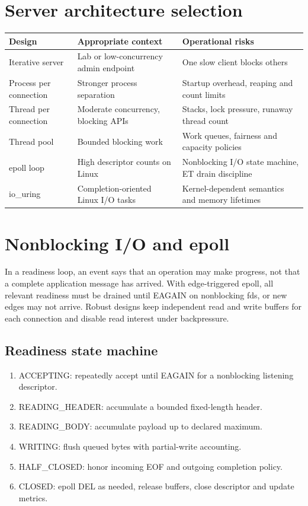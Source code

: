 \documentclass[11pt,letterpaper,oneside]{report}
\begin{document}
\chapter{Server architecture selection}
\begin{longtable}{p{.19\linewidth}>{\raggedright\arraybackslash}p{.28\linewidth}>{\raggedright\arraybackslash}p{.39\linewidth}}\toprule
Design & Appropriate context & Operational risks\\\midrule\endhead
Iterative server & Lab or low-concurrency admin endpoint & One slow client blocks others\\
Process per connection & Stronger process separation & Startup overhead, reaping and count limits\\
Thread per connection & Moderate concurrency, blocking APIs & Stacks, lock pressure, runaway thread count\\
Thread pool & Bounded blocking work & Work queues, fairness and capacity policies\\
epoll loop & High descriptor counts on Linux & Nonblocking I/O state machine, ET drain discipline\\
io\_uring & Completion-oriented Linux I/O tasks & Kernel-dependent semantics and memory lifetimes\\
\bottomrule\end{longtable}\chapter{Nonblocking I/O and epoll}
In a readiness loop, an event says that an operation may make progress, not that a complete application message has arrived. With edge-triggered epoll, all relevant readiness must be drained until EAGAIN on nonblocking fds, or new edges may not arrive. Robust designs keep independent read and write buffers for each connection and disable read interest under backpressure.

\section{Readiness state machine}
\begin{enumerate}
\item ACCEPTING: repeatedly accept until EAGAIN for a nonblocking listening descriptor.
\item READING\_HEADER: accumulate a bounded fixed-length header.
\item READING\_BODY: accumulate payload up to declared maximum.
\item WRITING: flush queued bytes with partial-write accounting.
\item HALF\_CLOSED: honor incoming EOF and outgoing completion policy.
\item CLOSED: epoll DEL as needed, release buffers, close descriptor and update metrics.
\end{enumerate}
\end{document}
